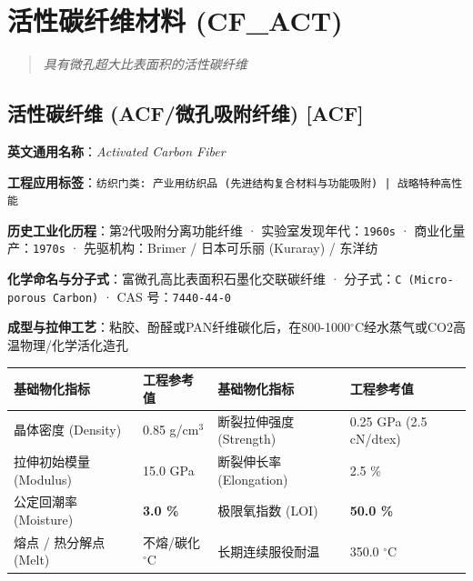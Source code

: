 \documentclass[11pt,openright,twoside,UTF8]{ctexbook}
\begin{document}
\chapter{活性碳纤维材料 (CF\_ACT)}
\begin{quote}
\small\itshape
具有微孔超大比表面积的活性碳纤维
\end{quote}

\section{活性碳纤维 (ACF/微孔吸附纤维) [ACF]}
\label{sec:acf}

\noindent\textbf{英文通用名称}：\textit{Activated Carbon Fiber}\par
\noindent\textbf{工程应用标签}：\texttt{纺织门类: 产业用纺织品 (先进结构复合材料与功能吸附) | 战略特种高性能}\par
\noindent\textbf{历史工业化历程}：第2代吸附分离功能纤维 · 实验室发现年代：\texttt{1960s} · 商业化量产：\texttt{1970s} · 先驱机构：Brimer / 日本可乐丽 (Kuraray) / 东洋纺\par
\noindent\textbf{化学命名与分子式}：富微孔高比表面积石墨化交联碳纤维 · 分子式：\texttt{C (Micro-porous Carbon)} · CAS 号：\texttt{7440-44-0}\par
\noindent\textbf{成型与拉伸工艺}：粘胶、酚醛或PAN纤维碳化后，在800-1000$^\circ\mathrm{C}$经水蒸气或CO2高温物理/化学活化造孔\par

\vspace{0.15cm}
\begin{center}
\small
\begin{tabularx}{\textwidth}{p{3.8cm}Xp{3.8cm}X}
\toprule
\textbf{基础物化指标} & \textbf{工程参考值} & \textbf{基础物化指标} & \textbf{工程参考值} \\
\midrule
晶体密度 (Density) & 0.85 g/cm$^3$ & 断裂拉伸强度 (Strength) & 0.25 GPa (2.5 cN/dtex) \\
拉伸初始模量 (Modulus) & 15.0 GPa & 断裂伸长率 (Elongation) & 2.5 \% \\
公定回潮率 (Moisture) & \textbf{3.0 \%} & 极限氧指数 (LOI) & \textbf{50.0 \%} \\
熔点 / 热分解点 (Melt) & 不熔/碳化 $^\circ\mathrm{C}$ & 长期连续服役耐温 & 350.0 $^\circ\mathrm{C}$ \\
\bottomrule
\end{tabularx}
\end{center}
\vspace{0.15cm}
\end{document}
